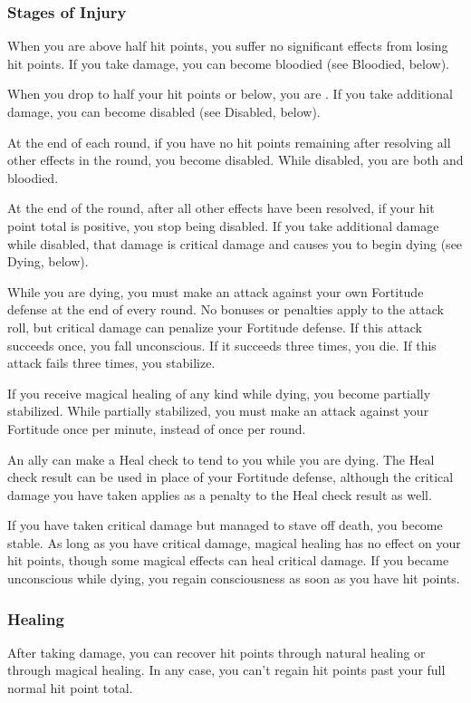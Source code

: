 \subsubsection{Stages of Injury}

 When you are above half hit points, you suffer no significant effects from losing hit points.
If you take damage, you can become bloodied (see Bloodied, below).

 When you drop to half your hit points or below, you are \bloodied.
If you take additional damage, you can become disabled (see Disabled, below).

\label{Disabled} At the end of each round, if you have no hit points remaining after resolving all other effects in the round, you become disabled.
While disabled, you are both \staggered and bloodied.

At the end of the round, after all other effects have been resolved, if your hit point total is positive, you stop being disabled.
If you take additional damage while disabled, that damage is critical damage and causes you to begin dying (see Dying, below).

\label{Dying} While you are dying, you must make an attack against your own Fortitude defense at the end of every round.
No bonuses or penalties apply to the attack roll, but critical damage can penalize your Fortitude defense.
If this attack succeeds once, you fall unconscious.
If it succeeds three times, you die.
If this attack fails three times, you stabilize.

If you receive magical healing of any kind while dying, you become partially stabilized.
While partially stabilized, you must make an attack against your Fortitude once per minute, instead of once per round.

An ally can make a Heal check to tend to you while you are dying.
The Heal check result can be used in place of your Fortitude defense, although the critical damage you have taken applies as a penalty to the Heal check result as well.

\label{Stable}
If you have taken critical damage but managed to stave off death, you become stable.
As long as you have critical damage, magical healing has no effect on your hit points, though some magical effects can heal critical damage.
If you became unconscious while dying, you regain consciousness as soon as you have hit points.

\subsubsection{Healing}
After taking damage, you can recover hit points through natural healing or through magical healing.
In any case, you can't regain hit points past your full normal hit point total.

